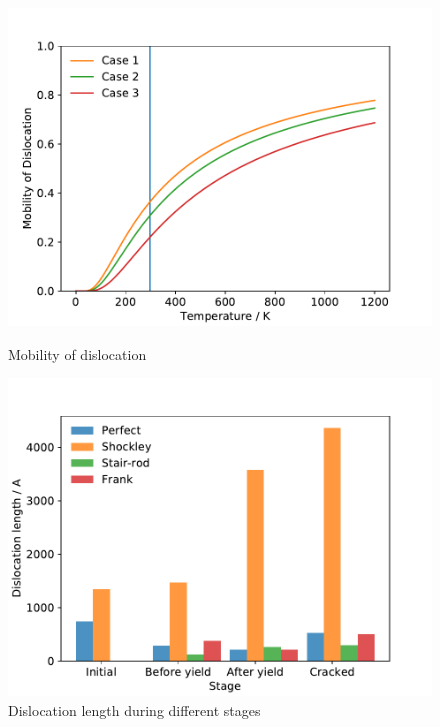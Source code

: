 \documentclass[metals,article,submit,moreauthors,pdftex,10pt,a4paper]{Definitions/mdpi}
\begin{document}
\begin{figure}[ht]
	\centering
	\begin{minipage}{0.495\textwidth}
		\includegraphics[width=1\linewidth]{img/temp}
		\centering
		\caption{Mobility of dislocation}
		\label{fig:temp}
	\end{minipage}	
	\hfill
	\begin{minipage}{0.495\textwidth}		
		\includegraphics[width=1\linewidth]{img/disum}
		\centering
		\caption{Dislocation length during different stages}
		\label{fig:disum}
	\end{minipage}
\end{figure}
\end{document}
